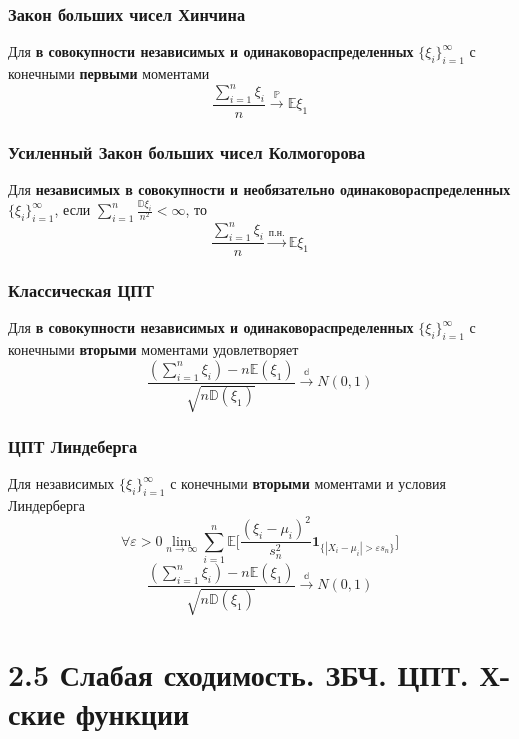\documentclass[a4paper, 14pt]{extarticle}
\begin{document}
\subsubsection*{Закон больших чисел Хинчина}
Для \textbf{в совокупности независимых и одинаковораспределенных} 
$\{\xi_i\}_{i=1}^{\infty}$ с конечными \textbf{первыми} моментами
$$\frac{\sum_{i=1}^n\xi_i}{n} \overset{\mathbb{P}}{\to} \mathbb{E}\xi_1$$	

\subsubsection*{Усиленный Закон больших чисел Колмогорова}
Для \textbf{независимых в совокупности и необязательно одинаковораспределенных} 
$\{\xi_i\}_{i=1}^{\infty}$, если $\sum_{i=1}^{n}\frac{\mathbb{D}\xi_i}{n^2} < \infty$, то
$$\frac{\sum_{i=1}^n\xi_i}{n} \overset{\textrm{п.н.}}{\to} \mathbb{E}\xi_1$$	

\subsubsection*{Классическая ЦПТ}
Для \textbf{в совокупности независимых и одинаковораспределенных} 
$\{\xi_i\}_{i=1}^{\infty}$ с конечными \textbf{вторыми} моментами удовлетворяет
$$\frac{(\sum_{i=1}^n\xi_i) - n\mathbb{E}(\xi_1)}{\sqrt{n\mathbb{D}(\xi_1)}} \overset{\mathbb{d}}{\to} N(0,1)$$	

\subsubsection*{ЦПТ Линдеберга}
Для независимых $\{\xi_i\}_{i=1}^{\infty}$ с конечными \textbf{вторыми} моментами и 
условия Линдерберга $$\forall \varepsilon > 0 \lim_{n\to \infty} \sum_{i=1}^{n}\mathbb{E}\Big[\frac{(\xi_i - \mu_i)^2}{s_n^2}\textbf{1}_{\{|X_i-\mu_i| > \varepsilon s_n\}}\Big]$$
$$\frac{(\sum_{i=1}^n\xi_i) - n\mathbb{E}(\xi_1)}{\sqrt{n\mathbb{D}(\xi_1)}} \overset{\mathbb{d}}{\to} N(0,1)$$	

	  
\newpage
\section*{2.5 Слабая сходимость. ЗБЧ. ЦПТ. Х-ские функции}
\end{document}
